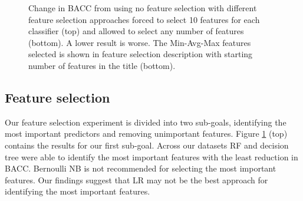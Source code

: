 \documentclass{sig-alternate-05-2015}
\begin{document}
	\begin{figure}
		\vspace{-5em}
		\centering
		\caption{Change in BACC from using no feature selection with different feature selection approaches forced to select 10 features for each classifier (top) and allowed to select any number of features (bottom). A lower result is worse. The Min-Avg-Max features selected is shown in feature selection description with starting number of features in the title (bottom). }
		\label{fig:feature_selection_limit_15}
		\vspace{-1.5em}
	\end{figure}
	
	
	\subsection{Feature selection}
	Our feature selection experiment is divided into two sub-goals, identifying the most important predictors and removing unimportant features. Figure \ref{fig:feature_selection_limit_15} (top) contains the results for our first sub-goal. Across our datasets RF and decision tree were able to identify the most important features with the least reduction in BACC. Bernoulli NB is not recommended for selecting the most important features. Our findings suggest that LR may not be the best approach for identifying the most important features.
	
\end{document}
